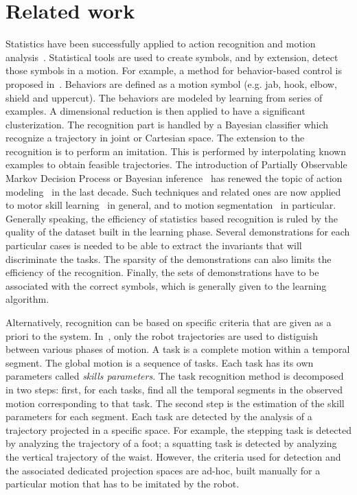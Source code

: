 \documentclass[letterpaper, 10pt, conference]{ieeeconf}      %
\begin{document}
\section{Related work}
Statistics have been successfully applied
to action recognition and motion analysis~\cite{schaal03}.
Statistical tools are used to create symbols, and by extension, detect those
symbols in a motion. For example, a method for behavior-based control 
is proposed in~\cite{drumwright03, drumwright04}. Behaviors are defined 
as a motion symbol (e.g. jab, hook, elbow, shield and uppercut). 
The behaviors are modeled by learning from series of examples.
A dimensional reduction is then applied to have a significant
clusterization.  The recognition part is handled by a Bayesian classifier which
recognize a trajectory in joint or Cartesian space. The extension to the recognition
is to perform an imitation. This is performed by interpolating known examples to obtain
feasible trajectories. The introduction of Partially
Observable Markov Decision Process or Bayesian inference~\cite{pearl88} has
renewed the topic of action modeling~\cite{kaelbling98} in the last decade. Such
techniques and related ones are now applied to motor skill learning~\cite{peters08} in
general, and to motion segmentation~\cite{calinon10, inamura04} in particular. 
Generally speaking, the efficiency of statistics based recognition is ruled by the quality of the dataset built
in the learning phase.
Several demonstrations for each particular cases is needed to be able to extract
the invariants that will discriminate the tasks. The sparsity of the demonstrations
can also limits the efficiency of the recognition. Finally, the sets of demonstrations
have to be associated with the correct symbols, which is generally given to the learning algorithm.

Alternatively, recognition can be based on specific criteria that are given as 
a priori to the system. In~\cite{nakaoka07}, only the robot trajectories
are used to distiguish between various phases of motion. A task is
a complete motion within a temporal segment. The global motion
is a sequence of tasks. Each task has its own
parameters called \emph{skills parameters}. The task recognition method is decomposed in two steps: 
first, for each tasks, find all the temporal segments in the observed motion
corresponding to that task.
The second step is the estimation of the skill parameters for each segment.
Each task are detected by the analysis of a trajectory projected in a specific space.
For example, the stepping task is detected by analyzing the trajectory 
of a foot; a squatting task is detected by analyzing the vertical trajectory of the waist.
However, the criteria used for detection and the associated dedicated projection spaces
are ad-hoc, built manually for a particular motion that has to be imitated by the robot.
\end{document}

